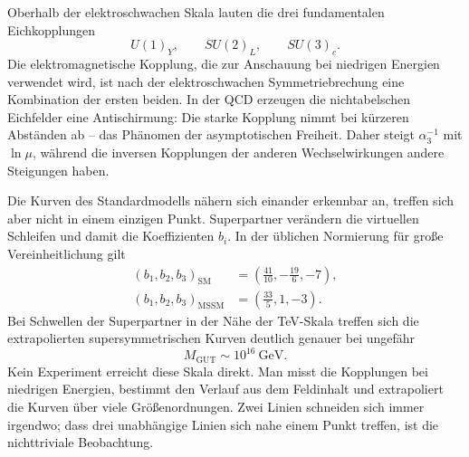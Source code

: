 Oberhalb der elektroschwachen Skala lauten die drei fundamentalen Eichkopplungen
\begin{equation}
U(1)_Y,\qquad SU(2)_L,\qquad SU(3)_c.
\end{equation}
Die elektromagnetische Kopplung, die zur Anschauung bei niedrigen Energien verwendet wird, ist nach der elektroschwachen Symmetriebrechung eine Kombination der ersten beiden. In der QCD erzeugen die nichtabelschen Eichfelder eine Antischirmung: Die starke Kopplung nimmt bei kürzeren Abständen ab – das Phänomen der asymptotischen Freiheit. Daher steigt \(\alpha_3^{-1}\) mit \(\ln\mu\), während die inversen Kopplungen der anderen Wechselwirkungen andere Steigungen haben.

Die Kurven des Standardmodells nähern sich einander erkennbar an, treffen sich aber nicht in einem einzigen Punkt. Superpartner verändern die virtuellen Schleifen und damit die Koeffizienten \(b_i\). In der üblichen Normierung für große Vereinheitlichung gilt
\begin{align}
(b_1,b_2,b_3)_{\mathrm{SM}}
&=\left(\frac{41}{10},-\frac{19}{6},-7\right),\\
(b_1,b_2,b_3)_{\mathrm{MSSM}}
&=\left(\frac{33}{5},1,-3\right).
\end{align}
Bei Schwellen der Superpartner in der Nähe der TeV-Skala treffen sich die extrapolierten supersymmetrischen Kurven deutlich genauer bei ungefähr
\begin{equation}
M_{\mathrm{GUT}}\sim 10^{16}\ \mathrm{GeV}.
\end{equation}
Kein Experiment erreicht diese Skala direkt. Man misst die Kopplungen bei niedrigen Energien, bestimmt den Verlauf aus dem Feldinhalt und extrapoliert die Kurven über viele Größenordnungen. Zwei Linien schneiden sich immer irgendwo; dass drei unabhängige Linien sich nahe einem Punkt treffen, ist die nichttriviale Beobachtung.

\begin{classroomqa}
\end{classroomqa}

